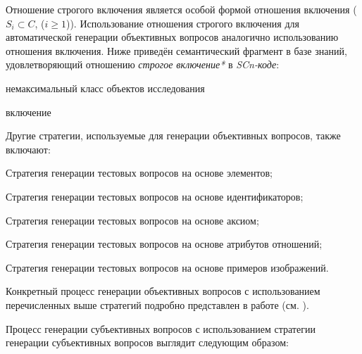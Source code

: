 \begin{textitemize}
\begin{textitemize}
		Отношение строгого включения является особой формой отношения включения ($S_{i}\subset  C $, ($i\ge 1$)). Использование отношения строгого включения для автоматической генерации объективных вопросов аналогично использованию отношения включения. Ниже приведён семантический фрагмент в базе знаний, удовлетворяющий отношению \textit{строгое включение*} в \textit{SCn-коде}:
		
		\begin{SCn}
			
			\begin{scnhaselementrolelist}{немаксимальный класс объектов исследования}
				\begin{scnrelfromlist}{включение} 
				\end{scnrelfromlist}
			\end{scnhaselementrolelist}
		\end{SCn}
	\end{textitemize}
	
\end{textitemize}	

Другие стратегии, используемые для генерации объективных вопросов, также включают:
\begin{textitemize}
	\item Стратегия генерации тестовых вопросов на основе элементов;
	\item Стратегия генерации тестовых вопросов на основе идентификаторов;
	\item Стратегия генерации тестовых вопросов на основе аксиом; 
	\item Стратегия генерации тестовых вопросов на основе атрибутов отношений;
	\item Стратегия генерации тестовых вопросов на основе примеров изображений.
\end{textitemize}

Конкретный процесс генерации объективных вопросов с использованием перечисленных выше стратегий подробно представлен в работе (см. ).

Процесс генерации субъективных вопросов с использованием стратегии генерации субъективных вопросов выглядит следующим образом:

